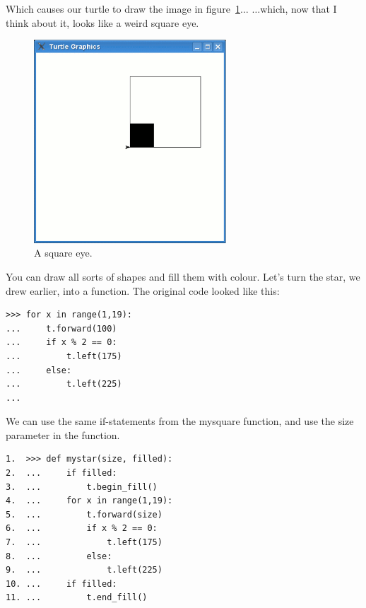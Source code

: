 \noindent
Which causes our turtle to draw the image in figure~\ref{fig28}$\ldots$ $\ldots$which, now that I think about it, looks like a weird square eye.

\begin{figure}
\begin{center}
\includegraphics[width=72mm]{eps/figure28.eps}
\end{center}
\caption{A square eye.}\label{fig28}
\end{figure}

You can draw all sorts of shapes and fill them with colour. Let's turn the star, we drew earlier, into a function. The original code looked like this:

\begin{listing}
\begin{verbatim}
>>> for x in range(1,19):
...     t.forward(100)
...     if x % 2 == 0:
...         t.left(175)
...     else:
...         t.left(225)
...
\end{verbatim}
\end{listing}

We can use the same if-statements from the mysquare function, and use the size parameter in the  function.

\begin{listing}
\begin{verbatim}
1.  >>> def mystar(size, filled):
2.  ...     if filled:
3.  ...         t.begin_fill()
4.  ...     for x in range(1,19):
5.  ...         t.forward(size)
6.  ...         if x % 2 == 0:
7.  ...             t.left(175)
8.  ...         else:
9.  ...             t.left(225)
10. ...     if filled:
11. ...         t.end_fill()
\end{verbatim}
\end{listing}

